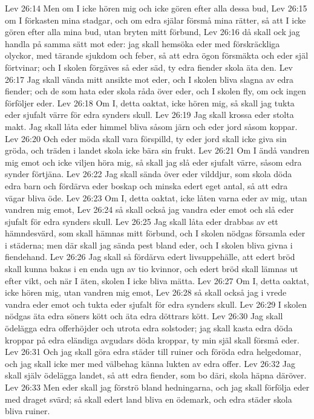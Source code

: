Lev 26:14  Men om I icke hören mig och icke gören efter alla dessa bud,
Lev 26:15  om I förkasten mina stadgar, och om edra själar försmå mina rätter, så att I icke gören efter alla mina bud, utan bryten mitt förbund,
Lev 26:16  då skall ock jag handla på samma sätt mot eder: jag skall hemsöka eder med förskräckliga olyckor, med tärande sjukdom och feber, så att edra ögon försmäkta och eder själ förtvinar; och I skolen förgäves så eder säd, ty edra fiender skola äta den.
Lev 26:17  Jag skall vända mitt ansikte mot eder, och I skolen bliva slagna av edra fiender; och de som hata eder skola råda över eder, och I skolen fly, om ock ingen förföljer eder.
Lev 26:18  Om I, detta oaktat, icke hören mig, så skall jag tukta eder sjufalt värre för edra synders skull.
Lev 26:19  Jag skall krossa eder stolta makt. Jag skall låta eder himmel bliva såsom järn och eder jord såsom koppar.
Lev 26:20  Och eder möda skall vara förspilld, ty eder jord skall icke giva sin gröda, och träden i landet skola icke bära sin frukt.
Lev 26:21  Om I ändå vandren mig emot och icke viljen höra mig, så skall jag slå eder sjufalt värre, såsom edra synder förtjäna.
Lev 26:22  Jag skall sända över eder vilddjur, som skola döda edra barn och fördärva eder boskap och minska edert eget antal, så att edra vägar bliva öde.
Lev 26:23  Om I, detta oaktat, icke låten varna eder av mig, utan vandren mig emot,
Lev 26:24  så skall också jag vandra eder emot och slå eder sjufalt för edra synders skull.
Lev 26:25  Jag skall låta eder drabbas av ett hämndesvärd, som skall hämnas mitt förbund, och I skolen nödgas församla eder i städerna; men där skall jag sända pest bland eder, och I skolen bliva givna i fiendehand.
Lev 26:26  Jag skall så fördärva edert livsuppehälle, att edert bröd skall kunna bakas i en enda ugn av tio kvinnor, och edert bröd skall lämnas ut efter vikt, och när I äten, skolen I icke bliva mätta.
Lev 26:27  Om I, detta oaktat, icke hören mig, utan vandren mig emot,
Lev 26:28  så skall också jag i vrede vandra eder emot och tukta eder sjufalt för edra synders skull.
Lev 26:29  I skolen nödgas äta edra söners kött och äta edra döttrars kött.
Lev 26:30  Jag skall ödelägga edra offerhöjder och utrota edra solstoder; jag skall kasta edra döda kroppar på edra eländiga avgudars döda kroppar, ty min själ skall försmå eder.
Lev 26:31  Och jag skall göra edra städer till ruiner och föröda edra helgedomar, och jag skall icke mer med välbehag känna lukten av edra offer.
Lev 26:32  Jag skall själv ödelägga landet, så att edra fiender, som bo däri, skola häpna däröver.
Lev 26:33  Men eder skall jag förströ bland hedningarna, och jag skall förfölja eder med draget svärd; så skall edert land bliva en ödemark, och edra städer skola bliva ruiner.
